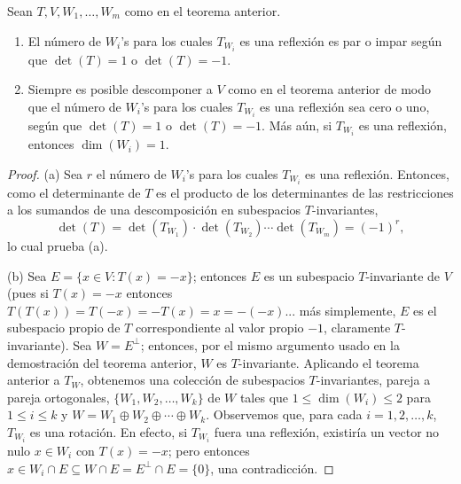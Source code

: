 \begin{teorema}
    Sean $T,V,W_1,\dots,W_m$ como en el teorema anterior.
    \begin{enumerate}[label=(\alph*)]
        \item El número de $W_i$'s para los cuales $T_{W_i}$ es una reflexión es par o impar según que $\det(T)=1$ o $\det(T)=-1$.
        \item Siempre es posible descomponer a $V$ como en el teorema anterior de modo que el número de $W_i$'s para los cuales $T_{W_i}$ es una reflexión sea cero o uno, según que $\det(T)=1$ o $\det(T)=-1$. Más aún, si $T_{W_i}$ es una reflexión, entonces $\dim(W_i)=1$.
    \end{enumerate}
\end{teorema}

\begin{proof}
    (a) Sea $r$ el número de $W_i$'s para los cuales $T_{W_i}$ es una reflexión. Entonces, como el determinante de $T$ es el producto de los determinantes de las restricciones a los sumandos de una descomposición en subespacios $T$-invariantes,
    \begin{equation*}
        \det(T)=\det(T_{W_1})\cdot\det(T_{W_2})\cdots\det(T_{W_m})=(-1)^r,
    \end{equation*}
    lo cual prueba (a).

    (b) Sea $E=\{x\in V: T(x)=-x\}$; entonces $E$ es un subespacio $T$-invariante de $V$ (pues si $T(x)=-x$ entonces $T(T(x))=T(-x)=-T(x)=x=-(-x)$... más simplemente, $E$ es el subespacio propio de $T$ correspondiente al valor propio $-1$, claramente $T$-invariante). Sea $W=E^\perp$; entonces, por el mismo argumento usado en la demostración del teorema anterior, $W$ es $T$-invariante. Aplicando el teorema anterior a $T_W$, obtenemos una colección de subespacios $T$-invariantes, pareja a pareja ortogonales, $\{W_1,W_2,\dots,W_k\}$ de $W$ tales que $1\leq\dim(W_i)\leq 2$ para $1\leq i\leq k$ y $W=W_1\oplus W_2\oplus\cdots\oplus W_k$. Observemos que, para cada $i=1,2,\dots,k$, $T_{W_i}$ es una rotación. En efecto, si $T_{W_i}$ fuera una reflexión, existiría un vector no nulo $x\in W_i$ con $T(x)=-x$; pero entonces $x\in W_i\cap E\subseteq W\cap E=E^\perp\cap E=\{0\}$, una contradicción.


\end{proof}
